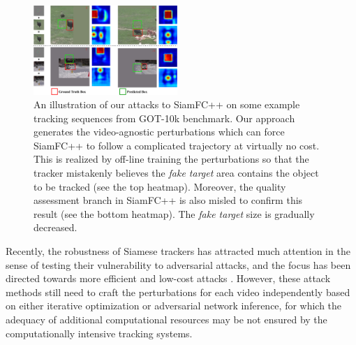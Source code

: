 \documentclass[journal]{IEEEtran}
\begin{document}

\begin{figure}[t]
  \centering
  \includegraphics[width=0.485\textwidth]{images_imperceptible/1_v8.pdf}
  \caption{An illustration of our attacks to SiamFC++ on some example tracking sequences from GOT-10k benchmark. Our approach generates the video-agnostic perturbations which can force SiamFC++ to follow a complicated trajectory at virtually no cost. This is realized by off-line training the perturbations so that the tracker mistakenly believes the \textit{fake target} area contains the object to be tracked (see the top heatmap). Moreover, the quality assessment branch in SiamFC++ is also misled to confirm this result (see the bottom heatmap). The \textit{fake target} size is gradually decreased.} 
  \label{fig:1}
\end{figure}

Recently, the robustness of Siamese trackers has attracted much attention in the sense of testing their vulnerability to adversarial attacks, and the focus has been directed towards more efficient and low-cost attacks \cite{TTP,FAN,SPARK,chen2020one}. However, these attack methods still need to craft the perturbations for each video independently based on either iterative optimization or adversarial network inference, for which the adequacy of additional computational resources may be not ensured by the computationally intensive tracking systems. 
\end{document}
